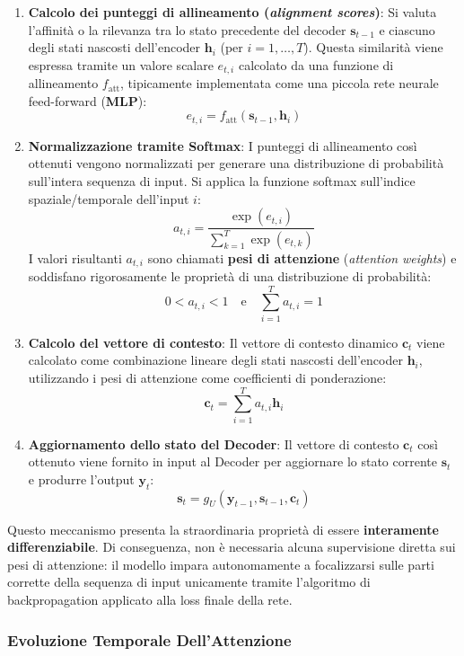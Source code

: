﻿\documentclass[11pt, a4paper]{article}
\begin{document}
\begin{enumerate}
    \item \textbf{Calcolo dei punteggi di allineamento (\emph{alignment scores})}:
    Si valuta l'affinità o la rilevanza tra lo stato precedente del decoder $\bm{s}_{t-1}$ e ciascuno degli stati nascosti dell'encoder $\bm{h}_i$ (per $i = 1, \dots, T$). Questa similarità viene espressa tramite un valore scalare $e_{t,i}$ calcolato da una funzione di allineamento $f_{\text{att}}$, tipicamente implementata come una piccola rete neurale feed-forward (\textbf{MLP}):
    \[ e_{t,i} = f_{\text{att}}(\bm{s}_{t-1}, \bm{h}_i) \]

    \item \textbf{Normalizzazione tramite Softmax}:
    I punteggi di allineamento così ottenuti vengono normalizzati per generare una distribuzione di probabilità sull'intera sequenza di input. Si applica la funzione softmax sull'indice spaziale/temporale dell'input $i$:
    \[ a_{t,i} = \frac{\exp(e_{t,i})}{\sum_{k=1}^{T} \exp(e_{t,k})} \]
    I valori risultanti $a_{t,i}$ sono chiamati \textbf{pesi di attenzione} (\emph{attention weights}) e soddisfano rigorosamente le proprietà di una distribuzione di probabilità:
    \[ 0 < a_{t,i} < 1 \quad \text{e} \quad \sum_{i=1}^{T} a_{t,i} = 1 \]

    \item \textbf{Calcolo del vettore di contesto}:
    Il vettore di contesto dinamico $\bm{c}_t$ viene calcolato come combinazione lineare degli stati nascosti dell'encoder $\bm{h}_i$, utilizzando i pesi di attenzione come coefficienti di ponderazione:
    \[ \bm{c}_t = \sum_{i=1}^{T} a_{t,i} \bm{h}_i \]

    \item \textbf{Aggiornamento dello stato del Decoder}:
    Il vettore di contesto $\bm{c}_t$ così ottenuto viene fornito in input al Decoder per aggiornare lo stato corrente $\bm{s}_t$ e produrre l'output $\bm{y}_t$:
    \[ \bm{s}_t = g_U(\bm{y}_{t-1}, \bm{s}_{t-1}, \bm{c}_t) \]
\end{enumerate}

Questo meccanismo presenta la straordinaria proprietà di essere \textbf{interamente differenziabile}. Di conseguenza, non è necessaria alcuna supervisione diretta sui pesi di attenzione: il modello impara autonomamente a focalizzarsi sulle parti corrette della sequenza di input unicamente tramite l'algoritmo di backpropagation applicato alla loss finale della rete.

\subsubsection{Evoluzione Temporale Dell'Attenzione}
\end{document}
